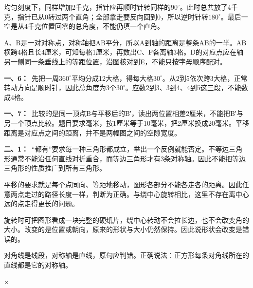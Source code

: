 \documentclass[multi=snippet,border=0pt]{standalone}
\newenvironment{snippet}[3]{\begin{minipage}{#1bp}\color{answerred}\fontsize{#2}{#3}\selectfont\raggedright}{\end{minipage}}
\begin{document}
\begin{snippet}{505}{11.5}{14}均匀刻度下，同样增加2千克，指针应再顺时针转同样的\(90^\circ\)。此时总共放了4千克，指针已从0转过两个直角；全部拿走要反向回到0，所以逆时针转\(180^\circ\)。最后一空是从4千克位置回零的总角度，不能仍填一个直角。\end{snippet}
\begin{snippet}{505}{11.5}{14}A、B是一对对称点，对称轴把AB平分，所以A到轴的距离是整条AB的一半。AB横跨4格且长4厘米，可知每格1厘米，再数出C、F各离轴3格。D的对应点应在轴另一侧同一条垂线上的等距位置，沿图核对到E，不能只按字母顺序配对。\end{snippet}
\begin{snippet}{505}{11.5}{14}\textbf{一、6：}\ 先把一周\(360^\circ\)平均分成12大格，得每大格\(30^\circ\)。从2到5依次跨3大格，正常转动方向是顺时针，因此总角度为3个\(30^\circ\)。应数2到3、3到4、4到5这三段，不能数成4格。\end{snippet}
\begin{snippet}{505}{11.5}{14}\textbf{一、7：}\ 比较的是同一顶点B与平移后的B′，读出两位置相差2厘米，不能把B′与另一个顶点比较。题目要求毫米，按1厘米等于10毫米，把2厘米换成20毫米。平移距离是对应点之间的距离，并不是两幅图之间的空隙宽度。\end{snippet}
\begin{snippet}{505}{11.5}{14}\textbf{二、1：}\ “都有”要求每一种三角形都成立，举出一个反例就能否定。不等边三角形通常不能沿任何直线对折重合，而等边三角形才有3条对称轴。因此不能把等边三角形的性质推广到所有三角形。\end{snippet}
\begin{snippet}{505}{11.5}{14}平移的要求就是每个点同向、等距地移动，图形各部分不能各走各的距离。因此任意两点走过的路径长度一样，判断为正确。与绕中心旋转相比，这里不存在离中心远的点走得更长的问题。\end{snippet}
\begin{snippet}{505}{11.5}{14}旋转时可把图形看成一块完整的硬纸片，绕中心转动不会拉长边，也不会改变角的大小。改变的是位置或朝向，原来的形状与大小仍然保持。因此说形状会改变是错误的。\end{snippet}
\begin{snippet}{505}{11.5}{14}对角线是线段，对称轴是直线，原句应判错。正确说法：正方形每条对角线所在的直线都是它的对称轴。\end{snippet}
\begin{snippet}{9.800000000000011}{10.5}{12.8}\(\times\)\end{snippet}
\end{document}
